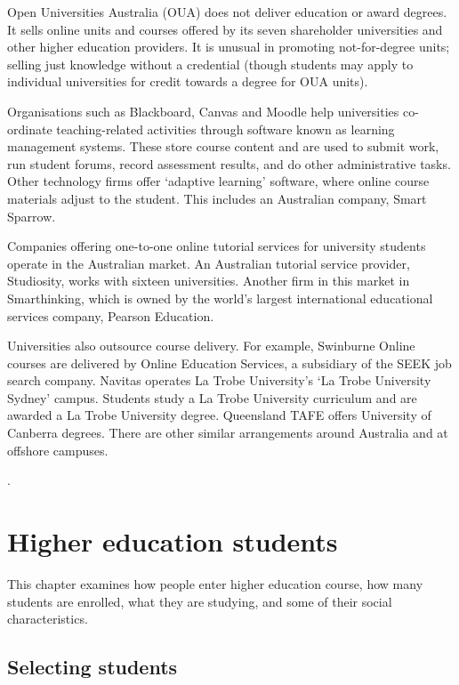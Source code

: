 \documentclass{grattan}
\begin{document}
Open Universities Australia (OUA) does not deliver education or award degrees. It sells online units and courses offered by its seven shareholder universities and other higher education providers. It is unusual in promoting not-for-degree units; selling just knowledge without a credential (though students may apply to individual universities for credit towards a degree for OUA units).

Organisations such as Blackboard, Canvas and Moodle help universities co-ordinate teaching-related activities through software known as learning management systems. These store course content and are used to submit work, run student forums, record assessment results, and do other administrative tasks. Other technology firms offer `adaptive learning' software, where online course materials adjust to the student. This includes an Australian company, Smart Sparrow.

Companies offering one-to-one online tutorial services for university students operate in the Australian market. An Australian tutorial service provider, Studiosity, works with sixteen universities. Another firm in this market in Smarthinking, which is owned by the world's largest international educational services company, Pearson Education.

Universities also outsource course delivery. For example, Swinburne Online courses are delivered by Online Education Services, a subsidiary of the SEEK job search company. Navitas operates La Trobe University's `La Trobe University Sydney' campus. Students study a La Trobe University curriculum and are awarded a La Trobe University degree. Queensland TAFE offers University of Canberra degrees. There are other similar arrangements around Australia and at offshore campuses.

.

%
\chapter{Higher education students }\label{chap:higher-education-students}

This chapter examines how people enter higher education course, how many students are enrolled, what they are studying, and some of their social characteristics.

%
\section{Selecting students}\label{sec:selecting-students}
\end{document}
